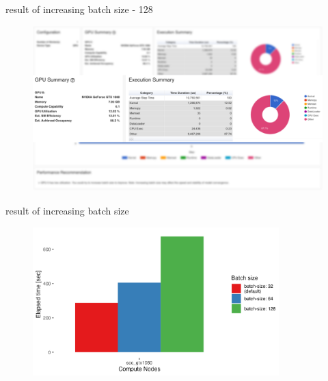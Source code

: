 \documentclass[compress,aspectratio=169]{beamer}
\begin{document}
\begin{frame}{result of increasing batch size - 128}
	\vspace{-1em}
\begin{center}
    \begin{figure}
        \includegraphics[width=1\textwidth]{../../data/scap_gtx1080_profiler-torch_batch-size-128_14633534_zoom}
    \end{figure}
    \end{center}

\end{frame}

\begin{frame}{result of increasing batch size}
    \vspace{-1em}
    \begin{center}
        \begin{figure}
            \includegraphics[width=0.85\textwidth]{../../data/sacct_barplot_by_nodes_batch-size-effect}

        \end{figure}
    \end{center}
\end{frame}
\end{document}
